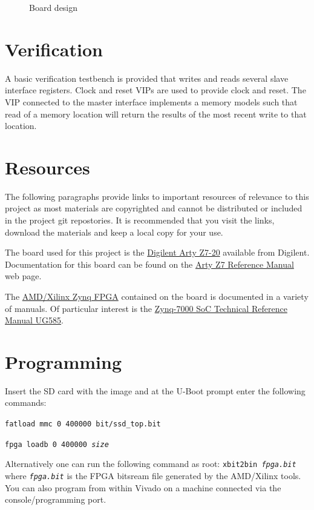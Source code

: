 \documentclass{report}
\begin{document}
\begin{figure}[h]
\begin{center}
{			}
	\end{center}
\caption{Board design}
\end{figure}

\chapter{Verification}
A basic verification testbench is provided that writes and reads several slave interface
registers.
Clock and reset VIPs are used to provide clock and reset.  The VIP connected to the master
interface implements a memory models such that read of a memory location will return the
results of the most recent write to that location.

\chapter{Resources}
The following paragraphs provide links to important resources of
relevance to this project as most materials are copyrighted and
cannot be distributed or included in the project git repostories.
It is recommended that you visit the links, download the materials
and keep a local copy for your use.

The board used for this project is the 
\href{https://digilent.com/shop/arty-z7-zynq-7000-soc-development-board/}
{Digilent Arty Z7-20}
available from Digilent.  Documentation for this board can be found on the
\href{https://digilent.com/reference/programmable-logic/arty-z7/reference-manual?redirect=1}
{Arty Z7 Reference Manual} web page. 

The \href{https://www.amd.com/en/products/adaptive-socs-and-fpgas/soc/zynq-7000.html}
{AMD/Xilinx Zynq FPGA} contained on the board is documented in a variety
of manuals.  Of particular interest is the
\href{https://docs.xilinx.com/v/u/en-US/ug585-Zynq-7000-TRM}
{Zynq-7000 SoC Technical Reference Manual UG585}.

\chapter{Programming}
Insert the SD card with the image and at the U-Boot prompt enter the following
commands:

\texttt{fatload mmc 0 400000 bit/ssd\_top.bit}

\texttt{fpga loadb 0 400000 \textit{size}}

Alternatively one can run the following command as root:
\texttt{xbit2bin \textit{fpga.bit}} where \texttt{\textit{fpga.bit}} is the
FPGA bitsream file generated by the AMD/Xilinx tools.  You can also program
from within Vivado on a machine connected via the console/programming port.
\end{document}
